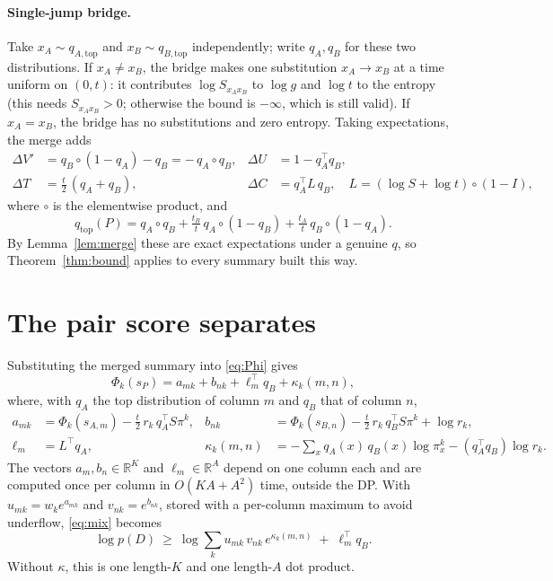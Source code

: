 \documentclass[11pt]{article}
\begin{document}
\paragraph{Single-jump bridge.} Take $x_A\sim q_{A,\mathrm{top}}$ and
$x_B\sim q_{B,\mathrm{top}}$ independently; write $q_A,q_B$ for these two
distributions. If $x_A\ne x_B$, the bridge makes one substitution
$x_A\to x_B$ at a time uniform on $(0,t)$: it contributes $\log S_{x_Ax_B}$ to
$\log g$ and $\log t$ to the entropy (this needs $S_{x_Ax_B}>0$; otherwise the
bound is $-\infty$, which is still valid). If $x_A=x_B$, the bridge has no
substitutions and zero entropy. Taking expectations, the merge adds
\begin{align*}
\Delta V'&=q_B\circ(1-q_A)-q_B=-\,q_A\circ q_B, &
\Delta U&=1-q_A^\top q_B, \\
\Delta T&=\tfrac t2\,(q_A+q_B), &
\Delta C&=q_A^\top L\,q_B,\quad L=(\log S+\log t)\circ(1-I),
\end{align*}
where $\circ$ is the elementwise product, and
\[
q_{\mathrm{top}}(P)=q_A\circ q_B+\tfrac{t_B}{t}\,q_A\circ(1-q_B)
 +\tfrac{t_A}{t}\,q_B\circ(1-q_A).
\]
By Lemma~\ref{lem:merge} these are exact expectations under a genuine $q$, so
Theorem~\ref{thm:bound} applies to every summary built this way.

\section{The pair score separates}
\label{sec:separates}

Substituting the merged summary into \eqref{eq:Phi} gives
\begin{equation}\label{eq:sep}
\Phi_k(s_P)=a_{mk}+b_{nk}+\ell_m^\top q_B+\kappa_k(m,n),
\end{equation}
where, with $q_A$ the top distribution of column $m$ and $q_B$ that of
column $n$,
\begin{align*}
a_{mk}&=\Phi_k(s_{A,m})-\tfrac t2\,r_k\,q_A^\top S\pi^k, &
b_{nk}&=\Phi_k(s_{B,n})-\tfrac t2\,r_k\,q_B^\top S\pi^k+\log r_k,\\
\ell_m&=L^\top q_A, &
\kappa_k(m,n)&=-\sum_xq_A(x)\,q_B(x)\log\pi^k_x-(q_A^\top q_B)\log r_k .
\end{align*}
The vectors $a_m,b_n\in\mathbb R^K$ and $\ell_m\in\mathbb R^A$ depend on one
column each and are computed once per column in $O(KA+A^2)$ time, outside
the DP.
With $u_{mk}=w_ke^{a_{mk}}$ and $v_{nk}=e^{b_{nk}}$, stored with a per-column
maximum to avoid underflow, \eqref{eq:mix} becomes
\begin{equation}\label{eq:score}
\log p(D)\ \ge\ \log\sum_ku_{mk}\,v_{nk}\,e^{\kappa_k(m,n)}\;+\;\ell_m^\top q_B .
\end{equation}
Without $\kappa$, this is one length-$K$ and one length-$A$ dot product.
\end{document}
